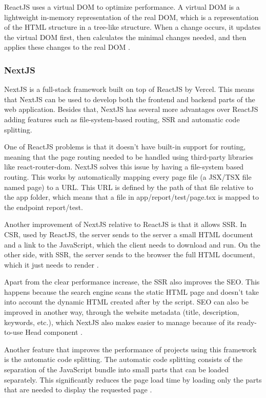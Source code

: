 ReactJS uses a virtual \gls{DOM} to optimize performance. A virtual
\gls{DOM} is a lightweight in-memory representation of the real \gls{DOM}, which is a
representation of the \gls{HTML} structure in a tree-like structure. When a change
occurs, it updates the virtual \gls{DOM} first, then calculates the minimal changes needed,
and then applies these changes to the real \gls{DOM} \cite{bawane2022review}.

\subsubsection{NextJS}
NextJS is a full-stack framework built on top of ReactJS by Vercel. This means
that NextJS can be used to develop both the frontend and backend parts of the
web application. Besides that, NextJS has several more advantages over ReactJS
adding features such as file-system-based routing, \gls{SSR}
and automatic code splitting.

One of ReactJS problems is that it doesn't have built-in support for routing,
meaning that the page routing needed to be handled using third-party libraries
like react-router-dom. NextJS solves this issue by having a file-system based
routing. This works by automatically mapping every page file (a \gls{JSX}/\gls{TSX}
file named page) to a \gls{URL}. This \gls{URL} is defined by the path of that file
relative to the app folder, which means that a file in app/report/test/page.tsx
is mapped to the endpoint report/test.

Another improvement of NextJS relative to ReactJS is that it allows \gls{SSR}. In
\gls{CSR}, used by ReactJS, the server sends to the server a small
\gls{HTML} document and a link to the JavaScript, which the client needs to download
and run. On the other side, with \gls{SSR}, the server sends to the browser the
full \gls{HTML} document, which it just needs to render \cite{Salanke_A.R_G.S_Dalali_2022}.

Apart from the clear performance increase, the \gls{SSR} also improves the \gls{SEO}.
This happens because the search engine scans the static
\gls{HTML} page and doesn't take into account the dynamic \gls{HTML} created after by
the script. \gls{SEO} can also be improved in another way, through the website
metadata (title, description, keywords, etc.), which NextJS also makes easier to
manage because of its ready-to-use Head component \cite{NextjsSSR}.

Another feature that improves the performance of projects using this framework
is the automatic code splitting. The automatic code splitting consists of
the separation of the JavaScript bundle into small parts that can be loaded
separately. This significantly reduces the page load time by loading only the
parts that are needed to display the requested page \cite{Salanke_A.R_G.S_Dalali_2022}.

